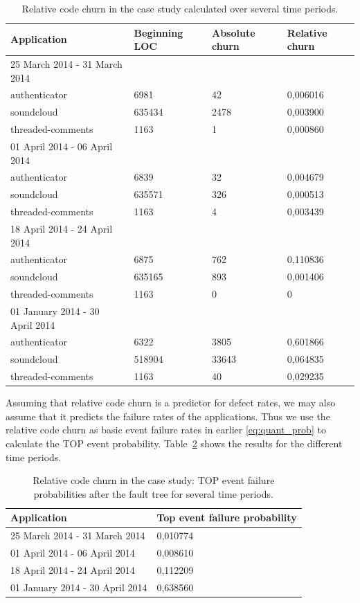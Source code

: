 \begin{table}[!h]
  \caption{Relative code churn in the case study calculated over several time periods.}
  \label{tab:app_churn}
  \begin{tabular}{ |l|l|l|l| }
    \hline
    Application & Beginning LOC & Absolute churn & Relative churn \\
    \hline
    25 March 2014 - 31 March 2014 \\
    authenticator & 6981 & 42 & 0,006016 \\
    soundcloud & 635434 & 2478 & 0,003900 \\
    threaded-comments & 1163 & 1 & 0,000860 \\
    \hline
    01 April 2014 - 06 April 2014 \\
    authenticator & 6839 & 32 & 0,004679 \\
    soundcloud & 635571 & 326 & 0,000513 \\
    threaded-comments & 1163 & 4 & 0,003439 \\
    \hline
    18 April 2014 - 24 April 2014 \\
    authenticator & 6875 & 762 & 0,110836 \\
    soundcloud & 635165 & 893 & 0,001406 \\
    threaded-comments & 1163 & 0 & 0  \\
    \hline
    01 January 2014 - 30 April 2014 \\
    authenticator & 6322 & 3805 & 0,601866 \\
    soundcloud & 518904 & 33643 & 0,064835 \\
    threaded-comments & 1163 & 40 & 0,029235 \\
    \hline
  \end{tabular}
\end{table}

Assuming that relative code churn is a predictor for defect rates, we may also assume that it predicts the failure rates of the applications. Thus we use the relative code churn as basic event failure rates in earlier \autoref{eq:quant_prob} to calculate the TOP event probability. Table~\ref{tab:app_churn_fail} shows the results for the different time periods.

\begin{table}[!h]
  \centering
  \caption{Relative code churn in the case study: TOP event failure probabilities after the fault tree for several time periods.}
  \label{tab:app_churn_fail}
  \begin{tabular}{ |l|l| }
    \hline
    Application & Top event failure probability\\
    \hline
    25 March 2014 - 31 March 2014 & 0,010774 \\
    01 April 2014 - 06 April 2014 & 0,008610 \\
    18 April 2014 - 24 April 2014 & 0,112209 \\
    01 January 2014 - 30 April 2014 & 0,638560 \\
    \hline
  \end{tabular}
\end{table}

